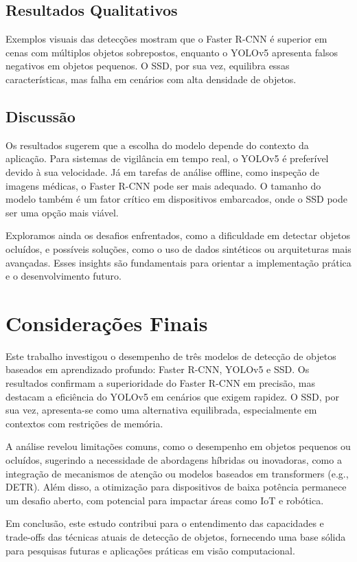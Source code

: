 \documentclass[a4paper,12pt]{article}
\begin{document}
	\subsection{Resultados Qualitativos}
	Exemplos visuais das detecções mostram que o Faster R-CNN é superior em cenas com múltiplos objetos sobrepostos, enquanto o YOLOv5 apresenta falsos negativos em objetos pequenos. O SSD, por sua vez, equilibra essas características, mas falha em cenários com alta densidade de objetos.
	
	\subsection{Discussão}
	Os resultados sugerem que a escolha do modelo depende do contexto da aplicação. Para sistemas de vigilância em tempo real, o YOLOv5 é preferível devido à sua velocidade. Já em tarefas de análise offline, como inspeção de imagens médicas, o Faster R-CNN pode ser mais adequado. O tamanho do modelo também é um fator crítico em dispositivos embarcados, onde o SSD pode ser uma opção mais viável.
	
	Exploramos ainda os desafios enfrentados, como a dificuldade em detectar objetos ocluídos, e possíveis soluções, como o uso de dados sintéticos ou arquiteturas mais avançadas. Esses insights são fundamentais para orientar a implementação prática e o desenvolvimento futuro.
	
	\section{Considerações Finais}
	Este trabalho investigou o desempenho de três modelos de detecção de objetos baseados em aprendizado profundo: Faster R-CNN, YOLOv5 e SSD. Os resultados confirmam a superioridade do Faster R-CNN em precisão, mas destacam a eficiência do YOLOv5 em cenários que exigem rapidez. O SSD, por sua vez, apresenta-se como uma alternativa equilibrada, especialmente em contextos com restrições de memória.
	
	A análise revelou limitações comuns, como o desempenho em objetos pequenos ou ocluídos, sugerindo a necessidade de abordagens híbridas ou inovadoras, como a integração de mecanismos de atenção ou modelos baseados em transformers (e.g., DETR). Além disso, a otimização para dispositivos de baixa potência permanece um desafio aberto, com potencial para impactar áreas como IoT e robótica.
	
	Em conclusão, este estudo contribui para o entendimento das capacidades e trade-offs das técnicas atuais de detecção de objetos, fornecendo uma base sólida para pesquisas futuras e aplicações práticas em visão computacional.
	
	\printbibliography
	
\end{document}
